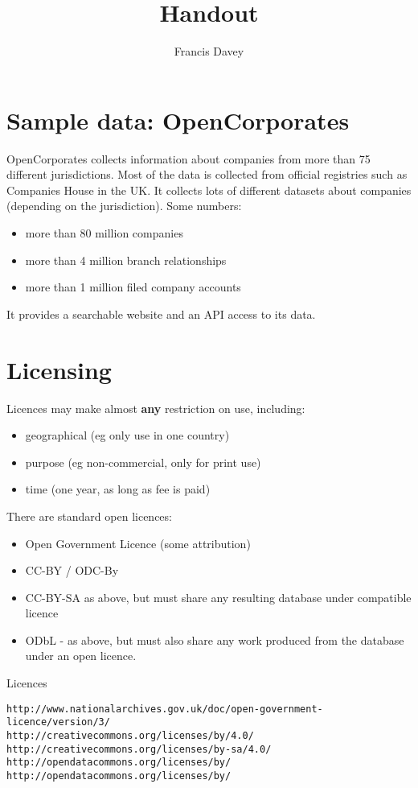 \documentclass[12pt, a4paper]{article}
\title{Handout}
\author{Francis Davey}
\date{}
\begin{document}
\raggedright

\section*{Sample data: OpenCorporates}
OpenCorporates collects information about companies from more than 75 different jurisdictions. Most of the data is collected from official registries such as Companies House in the UK. It collects lots of different datasets about companies (depending on the jurisdiction). Some numbers:

\begin{itemize}
\item more than 80 million companies
\item more than 4 million branch relationships
\item more than 1 million filed company accounts
\end{itemize}

It provides a searchable website and an API access to its data.

\section*{Licensing}

Licences may make almost {\bf any} restriction on use, including:
\begin{itemize}
\item geographical (eg only use in one country)
\item purpose (eg non-commercial, only for print use)
\item time (one year, as long as fee is paid)
\end{itemize}

There are standard open licences:
\begin{itemize}
\item Open Government Licence (some attribution)
\item CC-BY / ODC-By
\item CC-BY-SA as above, but must share any resulting database under compatible licence
\item ODbL - as above, but must also share any work produced from the database under an open licence.
\end{itemize}

Licences
\begin{verbatim}
http://www.nationalarchives.gov.uk/doc/open-government-licence/version/3/
http://creativecommons.org/licenses/by/4.0/
http://creativecommons.org/licenses/by-sa/4.0/
http://opendatacommons.org/licenses/by/
http://opendatacommons.org/licenses/by/  
\end{verbatim}
\end{document}
